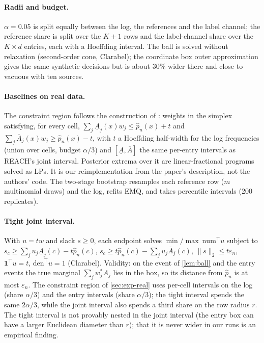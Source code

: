 \paragraph{Radii and budget.} $\alpha=0.05$ is split equally between the log, the references and the
label channel; the reference share is split over the $K+1$ rows and the label-channel share over the
$K\times d$ entries, each with a Hoeffding interval. The ball is solved without relaxation (second-order cone,
Clarabel); the coordinate box outer approximation gives the same synthetic decisions but is about
$30\%$ wider there and close to vacuous with ten sources.

\paragraph{Baselines on real data.} The constraint region follows the construction of
\citet{li2026matrix}: weights in the simplex satisfying, for every cell, $\sum_j\underline A_j(x)w_j\le\hat
p_n(x)+t$ and $\sum_j\overline A_j(x)w_j\ge\hat p_n(x)-t$, with $t$ a Hoeffding half-width for the log
frequencies (union over cells, budget $\alpha/3$) and $[\underline A,\overline A]$ the same per-entry intervals
as REACH's joint interval. Posterior extrema over it are linear-fractional programs solved as LPs. It
is our reimplementation from the paper's description, not the authors' code. The two-stage bootstrap
resamples each reference row ($m$ multinomial draws) and the log, refits EMQ, and takes percentile
intervals (200 replicates).

\paragraph{Tight joint interval.} With $u=tw$ and slack $s\ge0$, each endpoint solves
$\min/\max\ \text{num}^{\top}u$ subject to $s_c\ge\sum_ju_j\underline A_j(c)-t\hat p_n(c)$,
$s_c\ge t\hat p_n(c)-\sum_ju_j\overline A_j(c)$, $\lVert s\rVert_2\le t\varepsilon_n$, $\mathbf 1^{\top}u=t$,
$\text{den}^{\top}u=1$ (Clarabel). Validity: on the event of \cref{lem:ball} and the entry events the
true marginal $\sum_jw^{*}_jA_j$ lies in the box, so its distance from $\hat p_n$ is at most
$\varepsilon_n$. The constraint region of \cref{sec:exp-real} uses per-cell intervals on the log
(share $\alpha/3$) and the entry intervals (share $\alpha/3$); the tight interval spends the same $2\alpha/3$,
while the joint interval also spends a third share on the row radius $r$. The tight interval is not
provably nested in the joint interval (the entry box can have a larger Euclidean diameter than $r$); that it
is never wider in our runs is an empirical finding.

